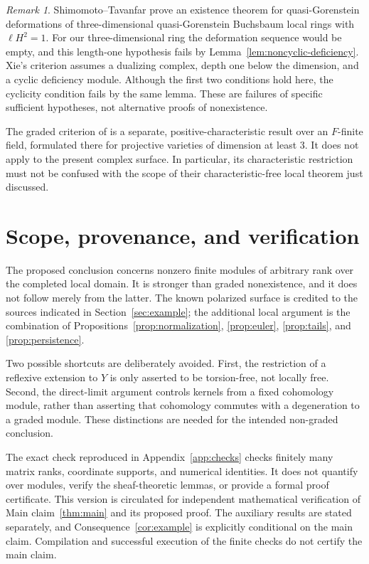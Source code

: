 \documentclass[11pt,reqno]{amsart}
\numberwithin{equation}{section}
\theoremstyle{definition}
\theoremstyle{remark}
\newtheorem{remark}[theorem]{Remark}
\newcommand{\len}{\ell}
\begin{document}
\begin{remark}\label{rem:existence-criteria}
Shimomoto--Tavanfar \cite[Theorem 3.2]{ShimomotoTavanfar2023}
prove an existence theorem for quasi-Gorenstein deformations of
three-dimensional quasi-Gorenstein Buchsbaum local rings with
$\len H^2=1$. For our three-dimensional ring the deformation sequence
would be empty, and this length-one hypothesis fails by
Lemma~\ref{lem:noncyclic-deficiency}.
Xie's criterion \cite[Theorem 1.1]{Xie2026} assumes a dualizing complex,
depth one below the dimension, and a cyclic deficiency module.
Although the first two conditions hold here, the cyclicity condition
fails by the same lemma. These are failures of specific sufficient
hypotheses, not alternative proofs of nonexistence.

The graded criterion of
\cite[Corollary 4.5]{ShimomotoTavanfar2023} is a separate,
positive-characteristic result over an $F$-finite field, formulated
there for projective varieties of dimension at least $3$.
It does not apply to the present complex surface. In particular,
its characteristic restriction must not be confused with the scope
of their characteristic-free local theorem just discussed.
\end{remark}

\section{Scope, provenance, and verification}\label{sec:scope}

The proposed conclusion concerns nonzero finite modules of arbitrary
rank over the completed local domain. It is stronger than graded
nonexistence, and it does not follow merely from the latter.
The known polarized surface is credited to the sources indicated in
Section~\ref{sec:example}; the additional local argument is the
combination of Propositions~\ref{prop:normalization},
\ref{prop:euler}, \ref{prop:tails}, and \ref{prop:persistence}.

Two possible shortcuts are deliberately avoided. First, the restriction
of a reflexive extension to $Y$ is only asserted to be torsion-free,
not locally free. Second, the direct-limit argument controls kernels
from a fixed cohomology module, rather than asserting that cohomology
commutes with a degeneration to a graded module. These distinctions
are needed for the intended non-graded conclusion.

The exact check reproduced in Appendix~\ref{app:checks} checks finitely
many matrix ranks, coordinate supports, and numerical identities. It does not quantify over modules,
verify the sheaf-theoretic lemmas, or provide a formal proof certificate.
This version is circulated for independent mathematical verification of
Main claim~\ref{thm:main} and its proposed proof. The auxiliary results
are stated separately, and Consequence~\ref{cor:example} is explicitly
conditional on the main claim. Compilation and successful execution of
the finite checks do not certify the main claim.
\end{document}
